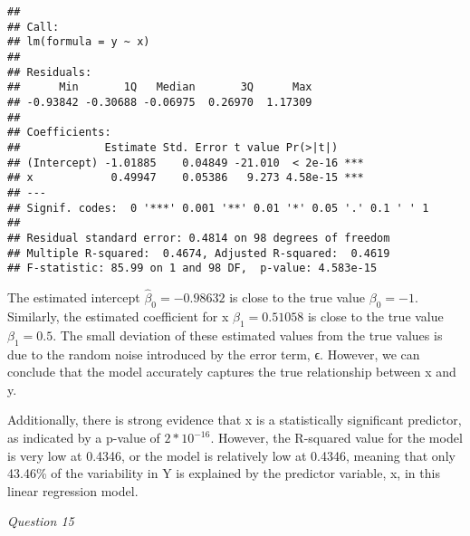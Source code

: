 \documentclass[
]{article}
\newenvironment{Shaded}{\begin{snugshade}}{\end{snugshade}}
\newcommand{\AttributeTok}[1]{\textcolor[rgb]{0.13,0.29,0.53}{#1}}
\newcommand{\ConstantTok}[1]{\textcolor[rgb]{0.56,0.35,0.01}{#1}}
\newcommand{\ControlFlowTok}[1]{\textcolor[rgb]{0.13,0.29,0.53}{\textbf{#1}}}
\newcommand{\DecValTok}[1]{\textcolor[rgb]{0.00,0.00,0.81}{#1}}
\newcommand{\FunctionTok}[1]{\textcolor[rgb]{0.13,0.29,0.53}{\textbf{#1}}}
\newcommand{\NormalTok}[1]{#1}
\newcommand{\OtherTok}[1]{\textcolor[rgb]{0.56,0.35,0.01}{#1}}
\newcommand{\SpecialCharTok}[1]{\textcolor[rgb]{0.81,0.36,0.00}{\textbf{#1}}}
\newcommand{\StringTok}[1]{\textcolor[rgb]{0.31,0.60,0.02}{#1}}
\begin{document}
\begin{verbatim}
## 
## Call:
## lm(formula = y ~ x)
## 
## Residuals:
##      Min       1Q   Median       3Q      Max 
## -0.93842 -0.30688 -0.06975  0.26970  1.17309 
## 
## Coefficients:
##             Estimate Std. Error t value Pr(>|t|)    
## (Intercept) -1.01885    0.04849 -21.010  < 2e-16 ***
## x            0.49947    0.05386   9.273 4.58e-15 ***
## ---
## Signif. codes:  0 '***' 0.001 '**' 0.01 '*' 0.05 '.' 0.1 ' ' 1
## 
## Residual standard error: 0.4814 on 98 degrees of freedom
## Multiple R-squared:  0.4674, Adjusted R-squared:  0.4619 
## F-statistic: 85.99 on 1 and 98 DF,  p-value: 4.583e-15
\end{verbatim}

The estimated intercept \(\hat{\beta}_0 = -0.98632\) is close to the
true value \(\beta_0 = -1\). Similarly, the estimated coefficient for x
\(\hat{\beta}_1 = 0.51058\) is close to the true value
\(\beta_1 = 0.5\). The small deviation of these estimated values from
the true values is due to the random noise introduced by the error term,
ϵ. However, we can conclude that the model accurately captures the true
relationship between x and y.

Additionally, there is strong evidence that x is a statistically
significant predictor, as indicated by a p-value of \(2*10^{-16}\).
However, the R-squared value for the model is very low at 0.4346, or the
model is relatively low at 0.4346, meaning that only 43.46\% of the
variability in Y is explained by the predictor variable, x, in this
linear regression model.

\emph{Question 15}

\begin{Shaded}
\end{Shaded}
\end{document}
